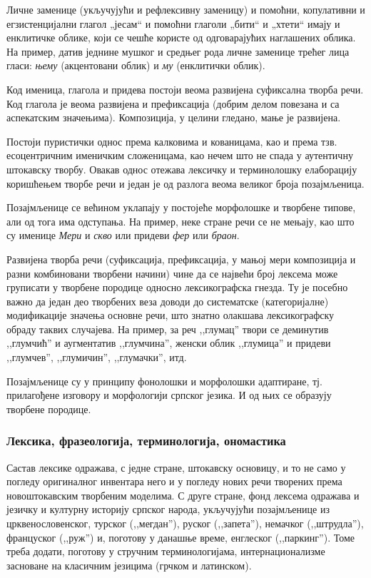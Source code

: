 \begin{multicols}{2}
Личне заменице (укључујући и рефлексивну заменицу) и помоћни, копулативни и егзистенцијални глагол „јесам“ и помоћни глаголи „бити“ и „хтети“ имају и енклитичке облике, који се чешће користе од одговарајућих наглашених облика. На пример, датив једнине мушког и средњег рода личне заменице трећег лица гласи: \textit{њему} (акцентовани облик) и \textit{му} (енклитички облик).

Код именица, глагола и придева постоји веома развијена суфиксална творба речи. Код глагола је веома развијена и префиксација (добрим делом повезана и са аспекатским значењима). Композиција, у целини гледано, мање је развијена. 

Постоји пуристички однос према калковима и кованицама, као и према тзв. есоцентричним именичким сложеницама, као нечем што не спада у аутентичну  штокавску творбу. Овакав однос отежава лексичку и терминолошку елаборацију коришћењем творбе речи и један је од разлога веома великог броја позајмљеница.

Позајмљенице се већином уклапају у постојеће морфолошке и творбене типове, али од тога има одступања. На пример, неке стране речи се не мењају, као што су именице \textit{Мери} и \textit{скво} или придеви \textit{фер} или \textit{браон}. 

Развијена творба речи (суфиксација, префиксација, у мањој мери композиција и разни комбиновани творбени начини) чине да се највећи број лексема може груписати у творбене породице односно лексикографска гнезда. Ту је посебно важно да један део творбених веза доводи до систематске (категоријалне) модификације значења основне речи,  што знатно олакшава лексикографску обраду таквих случајева. На пример, за реч ,,глумац'' твори се деминутив ,,глумчић'' и аугментатив ,,глумчина'', женски облик ,,глумица'' и придеви ,,глумчев'', ,,глумичин'', ,,глумачки'', итд. 

Позајмљенице су у принципу фонолошки и морфолошки адаптиране, тј. прилагођене изговору и морфологији српског језика. И од њих се образују творбене породице.


\subsubsection {Лексика, фразеологија, терминологија, ономастика}
  
Састав лексике одражава, с једне стране,  штокавску основицу, и то не само у погледу оригиналног инвентара него и у погледу нових речи творених према новоштокавским творбеним моделима. С друге стране, фонд лексема одражава и језичку и културну историју српског народа, укључујући позајмљенице из црквенословенског, турског (,,мегдан''), руског (,,запета''), немачког (,,штрудла''), француског (,,руж'') и, поготову у данашње време, енглеског (,,паркинг''). Томе треба додати, поготову у стручним терминологијама, интернационализме засноване на класичним језицима (грчком и латинском).


\end{multicols}
